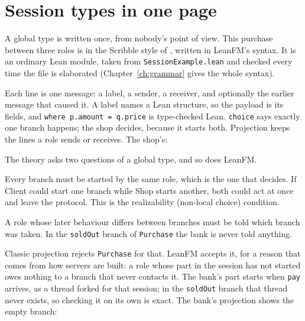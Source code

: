 \section{Session types in one page}

A global type is written once, from nobody's point of view. This purchase between
three roles is in the Scribble style of \citet{yoshida2013scribble}, written in
LeanFM's syntax. It is an ordinary Lean module, taken from
\texttt{SessionExample.lean} and checked every time the file is elaborated
(Chapter~\ref{ch:grammar} gives the whole syntax).



Each line is one message: a label, a sender, a receiver, and optionally the
earlier message that caused it. A label names a Lean structure, so the payload is
its fields, and \texttt{where p.amount = q.price} is type-checked Lean.
\texttt{choice} says exactly one branch happens; the shop decides, because it
starts both. Projection keeps the lines a role sends or receives. The shop's:



The theory asks two questions of a global type, and so does LeanFM.

\begin{description}[style=nextline]
  \item[One chooser per choice.] Every branch must be started by the same role,
  which is the one that decides. If Client could start one branch while Shop
  starts another, both could act at once and leave the protocol. This is the
  realizability (non-local choice) condition.
  \item[Everyone who must know, learns.] A role whose later behaviour differs
  between branches must be told which branch was taken. In the \texttt{soldOut}
  branch of \texttt{Purchase} the bank is never told anything.
\end{description}

Classic projection rejects \texttt{Purchase} for that. LeanFM accepts it, for a
reason that comes from how servers are built: a role whose part in the session
has not started owes nothing to a branch that never contacts it. The bank's part
starts when \texttt{pay} arrives, as a thread forked for that session; in the
\texttt{soldOut} branch that thread never exists, so checking it on its own is
exact. The bank's projection shows the empty branch:

